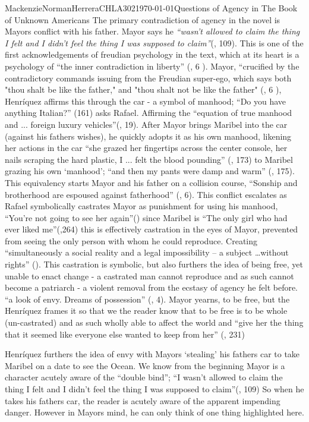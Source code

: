 \documentclass{article}
\begin{document}
\begin{mla}{Mackenzie}{Norman}{Herrera}{CHLA302}{\today}{Questions of Agency in The Book of Unknown Americans}
The primary contradiction of agency in the novel is Mayors conflict with his father. Mayor says he 
\textit{``wasn’t allowed to claim the thing I felt and I didn’t feel the thing I was supposed to claim''}(\cite{Henriquez2014-sh}, 109). This is one of the first acknowledgements of freudian psychology in the text, which at its heart is a psychology of ``the inner contradiction in liberty'' (\cite{loves-bdy}, 6 ).
Mayor, ``crucified by the contradictory commands issuing from the Freudian super-ego, which says both "thou shalt be like the father," and "thou shalt not be like the father" (\cite{loves-bdy}, 6 ), Henríquez affirms this through the car - a symbol of manhood; ``Do you have anything Italian?'' (161) asks Rafael. Affirming the ``equation of  true manhood and ... foreign luxury vehicles''(\cite{Uhlman2015-qx}, 19). After Mayor brings Maribel into the car (against his fathers wishes), he quickly adopts it as his own manhood, likening her actions in the car ``she grazed her fingertips across the center console, her nails scraping the hard plastic, I ... felt the blood pounding'' (\cite{Henriquez2014-sh}, 173) to Maribel grazing his own `manhood'; ``and then my pants were damp and warm'' (\cite{Henriquez2014-sh}, 175). This equivalency starts Mayor and his father on a collision course, ``Sonship and brotherhood are espoused against fatherhood'' (\cite{loves-bdy}, 6). This conflict escalates as Rafael symbolically castrates Mayor as punishment for using his manhood, ``You're not going to see her again''(\cite{Henriquez2014-sh}) since Maribel is ``The only girl who had ever liked me''(\cite{Henriquez2014-sh},264) this is effectively castration in the eyes of Mayor, prevented from seeing the only person with whom he could reproduce.  Creating  ``simultaneously a social reality and a legal impossibility – a subject \dots without rights'' (\cite{Lutes_Travis_2021}). This castration is symbolic, but also furthers the idea of being free, yet unable to enact change - a castrated man cannot reproduce and as such cannot become a patriarch - a violent removal from the ecstasy of agency he felt before. ``a look of envy. Dreams of possession'' (\cite{wretched}, 4). Mayor yearns, to be free, but the Henríquez frames it so that we the reader know that to be free is to be whole (un-castrated) and as such wholly able to affect the world and ``give her the thing that it seemed like everyone else wanted to keep from her'' (\cite{Henriquez2014-sh}, 231) 

Henríquez furthers the idea of envy with Mayors `stealing' his fathers car to take Maribel on a date to see the Ocean. We know from the beginning Mayor is a character acutely aware of the ``double bind''; ``I wasn’t allowed to claim the thing I felt and I didn’t feel the thing I was supposed to claim''(\cite{Henriquez2014-sh}, 109)  So when he takes his fathers car, the reader is acutely aware of the apparent impending danger. However in Mayors mind, he can only think of one thing highlighted here.


\end{mla}
\end{document}
